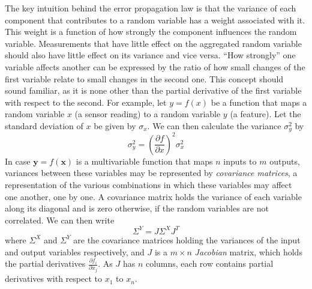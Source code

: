 The key intuition behind the error propagation law is that the variance of each component that contributes to a random variable has a weight associated with it. This weight is a function of how strongly the component influences the random variable. Measurements that have little effect on the
aggregated random variable should also have little effect on its variance and vice versa. ``How strongly'' one variable affects another
can be expressed by the ratio of how small changes of the first variable relate to small changes in the second one. This concept should sound familiar, as it is none other 
than the partial derivative of the first variable with respect to the second. For example, let $y=f(x)$ be a function that maps a random variable $x$ (a sensor reading) to a random variable $y$ (a feature). Let the standard deviation of $x$ be given by $\sigma_x$. We can then calculate the variance $\sigma_y^2$ by
\begin{equation}
\sigma_y^2=\left(\frac{\partial f}{\partial x}\right)^2 \sigma_x^2
\end{equation}
In case $\mathbf{y}=f(\mathbf{x})$ is a multivariable function that maps $n$ inputs to $m$ outputs, variances between these
variables may be represented by \textsl{covariance matrices}, a representation of the various combinations in
which these variables may affect one another, one by one. A covariance matrix holds the variance of each variable along its diagonal and is zero otherwise, if the random variables are not correlated. We can then write
\begin{equation}
\Sigma^Y= J \Sigma^X J^T
\end{equation}
where $\Sigma^X$ and $\Sigma^Y$ are the covariance matrices holding the variances of the input and output variables respectively, and
$J$ is a $m \times n$ \textsl{Jacobian} matrix, which holds the partial derivatives $\frac{\partial f_i}{\partial x_j}$. As $J$ has $n$ columns, each row contains partial derivatives with respect to $x_1$ to $x_n$.

